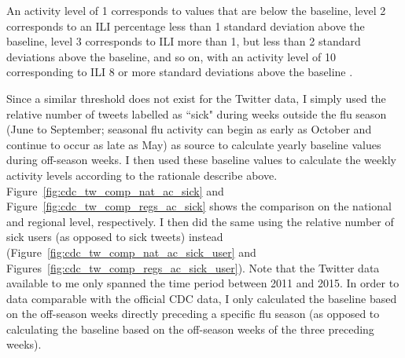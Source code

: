 \documentclass[11pt, a4paper,twoside]{report}\usepackage[]{graphicx}\usepackage[]{color}
\begin{document}
An activity level of 1 corresponds to values that are below the baseline, level 2 corresponds to an ILI percentage less than 1 standard deviation above the baseline, level 3 corresponds to ILI more than 1, but less than 2 standard deviations above the baseline, and so on, with an activity level of 10 corresponding to ILI 8 or more standard deviations above the baseline \citep{cdc_surveillance_2016}.
  
Since a similar threshold does not exist for the Twitter data, I simply used the relative number of tweets labelled as ``sick" during weeks outside the flu season (June to September; seasonal flu activity can begin as early as October and continue to occur as late as May) as source to calculate yearly baseline values during off-season weeks. I then used these baseline values to calculate the weekly activity levels according to the rationale describe above. Figure~\ref{fig:cdc_tw_comp_nat_ac_sick} and Figure~\ref{fig:cdc_tw_comp_regs_ac_sick} shows the comparison on the national and regional level, respectively. I then did the same using the relative number of sick users (as opposed to sick tweets) instead (Figure~\ref{fig:cdc_tw_comp_nat_ac_sick_user} and Figures~\ref{fig:cdc_tw_comp_regs_ac_sick_user}). Note that the Twitter data available to me only spanned the time period between 2011 and 2015. In order to data comparable with the official CDC data, I only calculated the baseline based on the off-season weeks directly preceding a specific flu season (as opposed to calculating the baseline based on the off-season weeks of the three preceding weeks).
\end{document}
